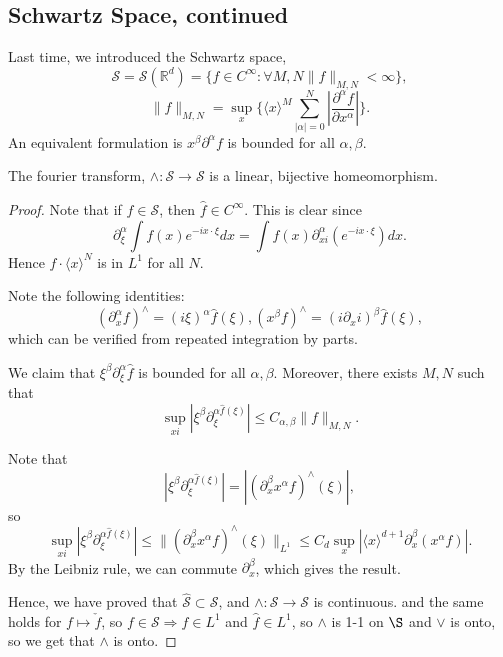 \documentclass[11pt]{scrartcl}
\newcommand{\R}{\mathbb{R}}
\let \hat \widehat
\newcommand{\<}{\langle}
\renewcommand{\>}{\rangle}
\begin{document}
\subsection{Schwartz Space, continued}
Last time, we introduced the Schwartz space,
$$\mathscr{S} = \mathscr{S}(\R^d) = \{f  \in C^{\infty}: \forall M, N \|f\|_{M, N} < \infty\},$$
$$\|f\|_{M, N} = \sup_x\{ \<x\>^M \sum_{|\alpha| = 0}^N \left |\frac{\partial^\alpha f}{\partial x^{\alpha}}\right |\}.$$
An equivalent formulation is $x^\beta \partial^{\alpha} f$ is bounded for all $\alpha, \beta$.
\begin{thm} The fourier transform, $\wedge:\mathscr{S} \rightarrow \mathscr{S}$ is a linear, bijective homeomorphism.
\end{thm}
\begin{proof}
Note that if $f \in \mathscr S$, then $\hat{f} \in C^{\infty}$.
This is clear since 
$$\partial_{\xi}^{\alpha}\int f(x) e^{-ix \cdot \xi}dx = \int f(x) \partial_{xi}^{\alpha} (e^{-ix \cdot \xi})dx.$$
Hence $f \cdot \<x\>^N$ is in $L^1$ for all $N$.

Note the following identities:
$$(\partial_{x}^{\alpha} f)^{\wedge} = (i\xi)^{\alpha} \hat{f}(\xi), (x^{\beta}f)^\wedge = (i \partial_xi)^\beta \hat{f}(\xi),$$
which can be verified from repeated integration by parts.

We claim that $\xi^\beta \partial_\xi ^{\alpha}\hat{f}$ is bounded for all $\alpha, \beta$. Moreover, there exists $M, N$ such that $$\sup_{xi}|\xi^\beta \partial_\xi ^{\alpha \hat{f}(\xi)}| \le C_{\alpha, \beta} \|f\|_{M, N}.$$

Note that $$|\xi^\beta \partial_\xi ^{\alpha \hat{f}(\xi)}| = |(\partial_x^\beta x^\alpha f)^\wedge(\xi) |,$$
so $$\sup_{xi}|\xi^\beta \partial_\xi ^{\alpha \hat{f}(\xi)}| \le  \|(\partial_x^\beta x^\alpha f)^\wedge(\xi) \|_{L^1} \le C_d \sup_x| \<x\>^{d+1} \partial_x^\beta (x^{\alpha} f)|.$$
By the Leibniz rule, we can commute $\partial_x^{\beta}$, which gives the result.

Hence, we have proved that $\hat{\mathscr S} \subset \mathscr S$, and $\wedge: \mathscr S \rightarrow \mathscr S$ is continuous.   and the same holds for $f \mapsto \check{f}$, so $f \in \mathscr S \Rightarrow f \in L^1$ and $\hat{f} \in L^1$, so $\wedge$ is 1-1 on $\S$ and $\vee$ is onto, so we get that $\wedge$ is onto.
\end{proof}
\end{document}
